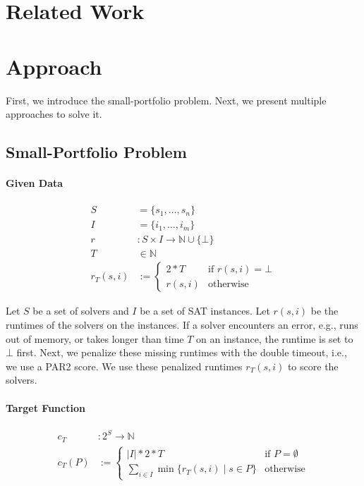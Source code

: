 \documentclass[conference]{IEEEtran}
\begin{document}
\section{Related Work}
\label{sec:related-work}

\section{Approach}
\label{sec:approach}

First, we introduce the small-portfolio problem.
Next, we present multiple approaches to solve it.

\subsection{Small-Portfolio Problem}

\paragraph{Given Data}

\begin{align*}
	S &= \{s_1, \dots, s_n\} \tag*{Solvers}\\
	I &= \{i_1, \dots, i_m\} \tag*{Instances}\\
	r &: S \times I \rightarrow \mathbb{N} \cup \{\bot\} \tag*{Runtimes (censored)}\\
	T &\in \mathbb{N} \tag*{Timeout}\\
	r_T(s,i) &:= \begin{cases}
		2*T & \text{if }r(s,i) = \bot\\
		r(s,i) & \text{otherwise}
	\end{cases} \tag*{Penalized Runtimes}
\end{align*}

Let $S$ be a set of solvers and $I$ be a set of SAT instances.
Let $r(s,i)$ be the runtimes of the solvers on the instances.
If a solver encounters an error, e.g., runs out of memory, or takes longer than time $T$ on an instance, the runtime is set to $\bot$ first.
Next, we penalize these missing runtimes with the double timeout, i.e., we use a PAR2 score.
We use these penalized runtimes $r_T(s,i)$ to score the solvers.

\paragraph{Target Function}

\begin{align*}
	c_{T} &: 2^S \rightarrow \mathbb{N}\\
	c_{T}(P) &:= \begin{cases}
		|I|*2*T & \text{if }P=\emptyset\\
		\sum_{i \in I}{\min\{r_T(s,i) \mid s \in P\}} & \text{otherwise}
	\end{cases} \tag*{Portfolio Cost}
\end{align*}
\end{document}
